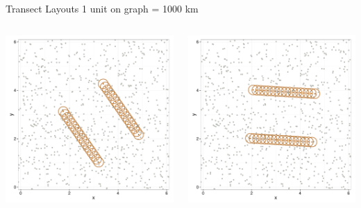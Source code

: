 \documentclass{beamer}
\begin{document}
\begin{frame}{Transect Layouts}
1 unit on graph = 1000 km
	\begin{columns}
		\begin{column}{0.48\textwidth}
			\includegraphics[width=\textwidth]{../images/slides-layoutT2.pdf}
		\end{column}
		\begin{column}{0.48\textwidth}
			\includegraphics[width=\textwidth]{../images/slides-layoutT1.pdf}
		\end{column}
	\end{columns}


\end{frame}
\end{document}
